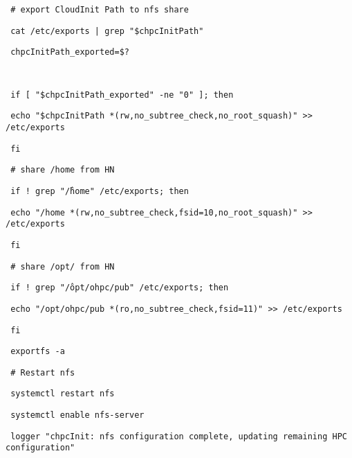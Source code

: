 \documentclass[12pt]{article}
\begin{document}
\begin{bash}\texttt{\small{ \# export CloudInit Path to nfs share}}\end{bash}
\begin{bash}\texttt{\small{ cat /etc/exports | grep "\$chpcInitPath"}}\end{bash}
\begin{bash}\texttt{\small{ chpcInitPath\_exported=\$?}}\end{bash}
\begin{bash}\texttt{\small{ }}\end{bash}
\begin{bash}\texttt{\small{ if [ "\${chpcInitPath\_exported}" -ne "0" ]; then}}\end{bash}
\begin{bash}\texttt{\small{     echo "\$chpcInitPath *(rw,no\_subtree\_check,no\_root\_squash)" >> /etc/exports}}\end{bash}
\begin{bash}\texttt{\small{ fi}}\end{bash}
\begin{bash}\texttt{\small{ \# share /home from HN}}\end{bash}
\begin{bash}\texttt{\small{ if ! grep "\^/home" /etc/exports; then}}\end{bash}
\begin{bash}\texttt{\small{     echo "/home *(rw,no\_subtree\_check,fsid=10,no\_root\_squash)" >> /etc/exports}}\end{bash}
\begin{bash}\texttt{\small{ fi}}\end{bash}
\begin{bash}\texttt{\small{ \# share /opt/ from HN}}\end{bash}
\begin{bash}\texttt{\small{ if ! grep "\^/opt/ohpc/pub" /etc/exports; then}}\end{bash}
\begin{bash}\texttt{\small{     echo "/opt/ohpc/pub *(ro,no\_subtree\_check,fsid=11)" >> /etc/exports}}\end{bash}
\begin{bash}\texttt{\small{ fi}}\end{bash}
\begin{bash}\texttt{\small{ exportfs -a}}\end{bash}
\begin{bash}\texttt{\small{ \# Restart nfs}}\end{bash}
\begin{bash}\texttt{\small{ systemctl restart nfs}}\end{bash}
\begin{bash}\texttt{\small{ systemctl enable nfs-server}}\end{bash}
\begin{bash}\texttt{\small{ logger "chpcInit: nfs configuration complete, updating remaining HPC configuration" }}\end{bash}
\end{document}
